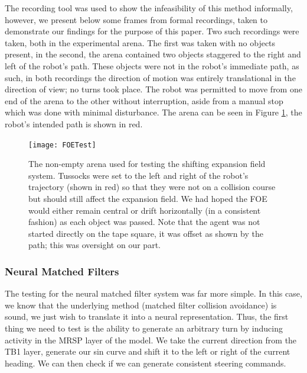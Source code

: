 \documentclass[a4paper,11pt,twoside,openright]{article}
\begin{document}
The recording tool was used to show the infeasibility of this method
informally, however, we present below some frames from formal
recordings, taken to demonstrate our findings for the purpose of this
paper. Two such recordings were taken, both in the experimental
arena. The first was taken with no objects present, in the second, the
arena contained two objects staggered to the right and left of the
robot's path. These objects were not in the robot's immediate path, as
such, in both recordings the direction of motion was entirely
translational in the direction of view; no turns took place. The robot
was permitted to move from one end of the arena to the other without
interruption, aside from a manual stop which was done with minimal
disturbance. The arena can be seen in Figure \ref{fig:foetest}, the
robot's intended path is shown in red.

\begin{figure}[h!]
  \centering
  \texttt{[image: FOETest]}
  \caption{\label{fig:foetest} The non-empty arena used for testing
    the shifting expansion field system. Tussocks were set to the left
    and right of the robot's trajectory (shown in red) so that they
    were not on a collision course but should still affect the
    expansion field. We had hoped the FOE would either remain central
    or drift horizontally (in a consistent fashion) as each object was
    passed. Note that the agent was not started directly on the tape
    square, it was offset as shown by the path; this was oversight on
    our part.  }
\end{figure}

\subsubsection{Neural Matched Filters}
The testing for the neural matched filter system was far more
simple. In this case, we know that the underlying method (matched
filter collision avoidance) is sound, we just wish to translate it
into a neural representation. Thus, the first thing we need to test is
the ability to generate an arbitrary turn by inducing activity in the
MRSP layer of the model. We take the current direction from the TB1
layer, generate our sin curve and shift it to the left or right of the
current heading. We can then check if we can generate consistent
steering commands.
\newline
\par
\end{document}
